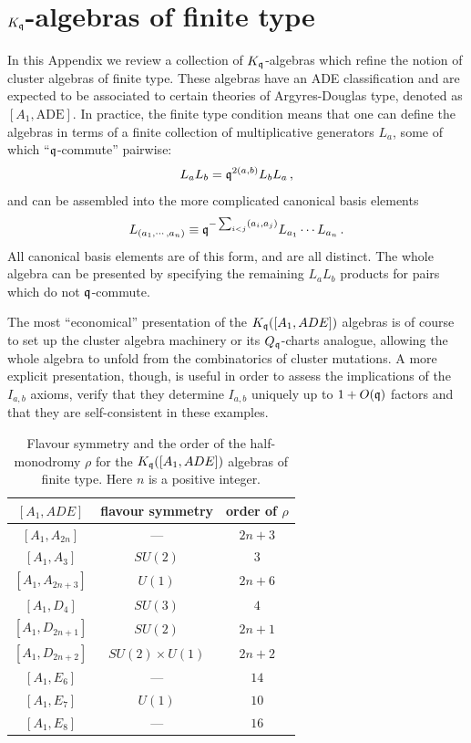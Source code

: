 \documentclass[12pt]{amsart}
\begin{document}
\section{$K_{\mathfrak{q}}$-algebras of finite type}\label{app:finite}
In this Appendix we review a collection of $K_{\mathfrak{q}}$-algebras which refine the notion of 
cluster algebras of finite type. These algebras have an ADE classification 
and are expected to be associated to certain theories of Argyres-Douglas type, 
denoted as $[A_1,\mathrm{ADE}]$. In practice, the finite type condition means that one can 
define the algebras in terms of a finite collection of multiplicative generators $L_a$, 
some of which ``$\mathfrak{q}$-commute'' pairwise:
\begin{equation}
	L_a L_b = \mathfrak{q}^{2(a,b)} L_b L_a \,,
\end{equation}
and can be assembled into the more complicated canonical basis elements
\begin{equation}
	L_{(a_1,\cdots, a_n)} \equiv \mathfrak{q}^{-\sum_{i<j} (a_i,a_j)} L_{a_1}\cdots L_{a_n} \,.
\end{equation}
All canonical basis elements are of this form, and are all distinct. The whole algebra can be presented by specifying the remaining $L_a L_b$ products for 
pairs which do not $\mathfrak{q}$-commute. 

The most ``economical'' presentation of the $K_{\mathfrak{q}}([A_1,ADE])$ algebras is of course to set up the cluster algebra machinery or its $Q_{\mathfrak{q}}$-charts analogue,
allowing the whole algebra to unfold from the combinatorics of cluster mutations. A more explicit presentation, though, is useful in order to 
assess the implications of the $I_{a,b}$ axioms, verify that they determine $I_{a,b}$ uniquely up to $1+O(\mathfrak{q})$ factors and that they are self-consistent in 
these examples. 

\begin{table}[h]
\centering
\begin{tabular}{c|c|c}
\hline
$[A_1, ADE]$ & flavour symmetry & order of $\rho$ \\
\hline
$[A_1, A_{2n}]$   & ---    & $2n+3$ \\
$[A_1, A_{3}]$ & $SU(2)$ & $3$ \\
$[A_1, A_{2n+3}]$ & $U(1)$ & $2n+6$ \\
\hline
$[A_1, D_4]$              & $SU(3)$            & $4$ \\
$[A_1, D_{2n+1}]$         & $SU(2)$            & $2n+1$ \\
$[A_1, D_{2n+2}]$  & $SU(2)\times U(1)$ & $2n+2$ \\
\hline
$[A_1, E_6]$ & ---    & $14$ \\
$[A_1, E_7]$ & $U(1)$ & $10$ \\
$[A_1, E_8]$ & ---    & $16$ \\
\hline
\end{tabular}
\caption{Flavour symmetry and the order of the half-monodromy $\rho$ for the
$K_{\mathfrak{q}}([A_1, ADE])$ algebras of finite type. Here $n$ is a positive integer.}
\label{tab:finite_type}
\end{table}
\end{document}
